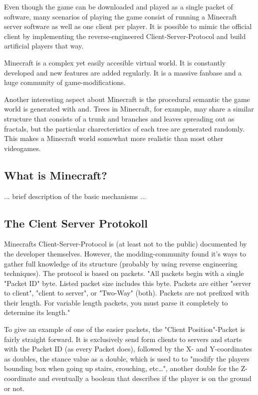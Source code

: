 Even though the game can be downloaded and played as a single packet of software, many scenarios of playing the game consist of running a Minecraft server software as well as one client per player. It is possible to mimic the official client by implementing the reverse-engineered Client-Server-Protocol and build artificial players that way.

Minecraft is a complex yet easily accesible virtual world. It is constantly developed and new features are added regularly. It is a massive fanbase and a huge community of game-modifications.

Another interesting aspect about Minecraft is the procedural semantic the game world is generated with and. Trees in Minecraft, for example, may share a similar structure that consists of a trunk and branches and leaves spreading out as fractals, but the particular charecteristics of each tree are generated randomly. This makes a Minecraft world somewhat more realistic than most other videogames.

        \subsection{What is Minecraft?}
... brief description of the basic mechanisms ...

        \subsection{The Cient Server Protokoll}
Minecrafts Client-Server-Protocol is (at least not to the public) documented by the developer themselves. However, the modding-community found it's ways to gather full knowledge of its structure (probably by using reverse engineering techniques). The protocol is based on packets. "All packets begin with a single "Packet ID" byte. Listed packet size includes this byte. Packets are either "server to client", "client to server", or "Two-Way" (both). Packets are not prefixed with their length. For variable length packets, you must parse it completely to determine its length." 

To give an example of one of the easier packets, the "Client Position"-Packet is fairly straight forward. It is exclusively send form clients to servers and starts with the Packet ID (as every Packet does), followed by the X- and Y-coordinates as doubles, the stance value as a double, which is used to to "modify the players bounding box when going up stairs, crouching, etc…", another double for the Z-coordinate and eventually a boolean that describes if the player is on the ground or not.~\cite{protocol}

